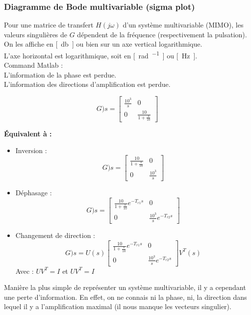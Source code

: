 \documentclass[document.tex]{subfiles}
\begin{document}
\subsubsection{Diagramme de Bode multivariable (sigma plot)}

Pour une matrice de transfert $H(j\omega)$ d'un système multivariable (MIMO), les valeurs singulières de $G$ dépendent de la fréquence (respectivement la pulsation).\\

On les affiche en \si{[\decibel]} ou bien sur un axe vertical logarithmique.\\
L'axe horizontal est logarithmique, soit en \si{[\radian\per\sec]} ou \si{[\hertz]}.\\

Command Matlab : \\

L'information de la phase est perdue.\\
L'information des directions d'amplification est perdue.


$$ G)s  = \begin{bmatrix} \frac{10^3}{s} & 0 \\ 0 & \frac{10}{1 + \frac{s}{10}} \end{bmatrix}$$

\textbf{Équivalent à :}

\begin{itemize}
\item Inversion :
$$ G)s  = \begin{bmatrix} \frac{10}{1 + \frac{s}{10}} & 0 \\ 0 & \frac{10^3}{s}  \end{bmatrix}$$
\item Déphasage :
$$ G)s  = \begin{bmatrix} \frac{10}{1 + \frac{s}{10}}e^{-T_{r1}s} & 0 \\ 0 & \frac{10^3}{s}e^{-T_{r2}s}  \end{bmatrix}$$
\item Changement de direction :
$$ G)s  = U(s)\begin{bmatrix} \frac{10}{1 + \frac{s}{10}}e^{-T_{r1}s} & 0 \\ 0 & \frac{10^3}{s}e^{-T_{r2}s}  \end{bmatrix} V^T(s)$$
Avec : $ U V^T = I $ et $U V^T = I $
\end{itemize}

Manière la plus simple de représenter un système multivariable, il y a cependant une perte d'information. En effet, on ne connais ni la phase, ni, la direction dans lequel il y a l'amplification maximal (il nous manque les vecteurs singulier).
\end{document}
